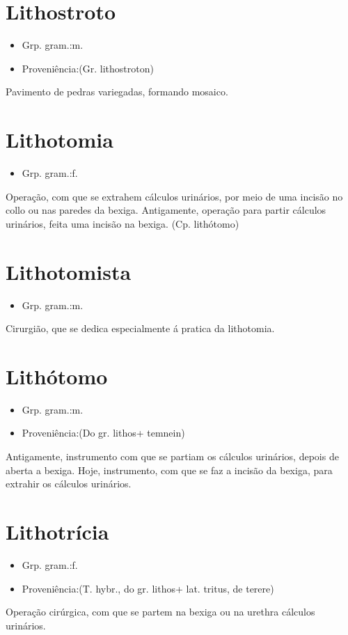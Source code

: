 \section{Lithostroto}
\begin{itemize}
\item {Grp. gram.:m.}
\end{itemize}
\begin{itemize}
\item {Proveniência:(Gr. \textunderscore lithostroton\textunderscore )}
\end{itemize}
Pavimento de pedras variegadas, formando mosaico.
\section{Lithotomia}
\begin{itemize}
\item {Grp. gram.:f.}
\end{itemize}
Operação, com que se extrahem cálculos urinários, por meio de uma incisão no collo ou nas paredes da bexiga.
Antigamente, operação para partir cálculos urinários, feita uma incisão na bexiga.
(Cp. \textunderscore lithótomo\textunderscore )
\section{Lithotomista}
\begin{itemize}
\item {Grp. gram.:m.}
\end{itemize}
Cirurgião, que se dedica especialmente á pratica da lithotomia.
\section{Lithótomo}
\begin{itemize}
\item {Grp. gram.:m.}
\end{itemize}
\begin{itemize}
\item {Proveniência:(Do gr. \textunderscore lithos\textunderscore  + \textunderscore temnein\textunderscore )}
\end{itemize}
Antigamente, instrumento com que se partiam os cálculos urinários, depois de aberta a bexiga.
Hoje, instrumento, com que se faz a incisão da bexiga, para extrahir os cálculos urinários.
\section{Lithotrícia}
\begin{itemize}
\item {Grp. gram.:f.}
\end{itemize}
\begin{itemize}
\item {Proveniência:(T. hybr., do gr. \textunderscore lithos\textunderscore  + lat. \textunderscore tritus\textunderscore , de \textunderscore terere\textunderscore )}
\end{itemize}
Operação cirúrgica, com que se partem na bexiga ou na urethra cálculos urinários.
